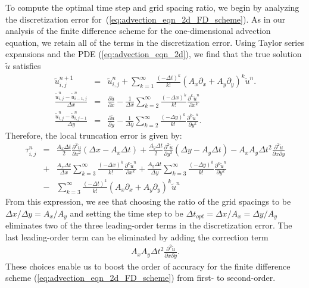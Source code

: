 \documentclass[fleqn,12pt,twoside]{article}
\newcommand{\bea}{\begin{eqnarray}}
\newcommand{\eea}{\end{eqnarray}}
\def\px{\partial x}
\def\py{\partial y}
\def\tu{\tilde{u}}
\def\dt{\Delta t}
\def\dx{\Delta x}
\def\dy{\Delta y}
\begin{document}
To compute the optimal time step and grid spacing ratio, we begin by analyzing 
the discretization error 
for~(\ref{eq:advection_eqn_2d_FD_scheme}).  As in our analysis of the finite
difference scheme for the one-dimensional advection equation, we retain all of 
the terms in the discretization error.  Using Taylor series expansions and
the PDE (\ref{eq:advection_eqn_2d}), we find that the true solution $\tu$ 
satisfies
\bea
  \tu^{n+1}_{i,j} &=& \tu^{n}_{i,j }
    + \sum_{k=1}^\infty \frac{\left( -\dt \right)^k}{k!} 
         \left( A_x \partial_x
              + A_y \partial_y \right)^k \tu^{n}.
  \label{eq:advection_eqn_2d_time_err}
  \\
  \frac{\tu^{n}_{i,j} - \tu^{n}_{i-1,j}}{\dx} &=& 
  \frac{\partial \tu}{\px} 
  - \frac{1}{\dx} \sum_{k=2}^\infty \frac{\left( -\dx \right)^k}{k!} 
       \frac{\partial^k \tu^n}{\px^k} 
  \label{eq:advection_eqn_2d_space_err_x}
  \\
  \frac{\tu^{n}_{i,j} - \tu^{n}_{i,j-1}}{\dy} &=&
  \frac{\partial \tu}{\py} 
  - \frac{1}{\dy} \sum_{k=2}^\infty \frac{\left( -\dy \right)^k}{k!} 
       \frac{\partial^k \tu^n}{\py^k} 
  \label{eq:advection_eqn_2d_space_err_y}.
\eea
Therefore, the local truncation error is given by:
\bea
  \tau^{n}_{i,j} &=&
      \frac{A_x \dt}{2} \frac{\partial^2 \tu}{\px^2}
      \left( \dx - A_x \dt \right)
    + \frac{A_y \dt}{2} \frac{\partial^2 \tu}{\py^2}
      \left( \dy - A_y \dt \right)
    - A_x A_y \dt^2 \frac{\partial^2 \tu}{\px \py}
   \nonumber \\
   &+& \frac{A_x\dt}{\dx} \sum_{k=3}^\infty \frac{\left( -\dx \right)^k}{k!} 
       \frac{\partial^k \tu^n}{\px^k} 
   + \frac{A_y\dt}{\dy} \sum_{k=3}^\infty \frac{\left( -\dy \right)^k}{k!} 
       \frac{\partial^k \tu^n}{\py^k} 
   \nonumber \\
   &-& \sum_{k=3}^\infty \frac{\left( -\dt \right)^k}{k!} 
       \left( A_x \partial_x + A_y \partial_y
              \right)^k \tu^{n} 
  \label{eq:advection_eqn_2d_trunc_err}
\eea
From this expression, we see that choosing the ratio of the grid spacings to
be $\dx/\dy = A_x/A_y$ and setting the time step to be 
$\dt_{opt} = \dx/A_x = \dy/A_y$ eliminates two of the three leading-order 
terms in the discretization error.   The last leading-order term can be 
eliminated by adding the correction term
\bea
   A_x A_y \dt^2 \frac{\partial^2 \tu}{\px \py}.
  \label{eq:advection_eqn_2d_corr_term}
\eea
These choices enable us to boost the order of accuracy for the finite 
difference scheme (\ref{eq:advection_eqn_2d_FD_scheme}) from first- to 
second-order.
\end{document}
